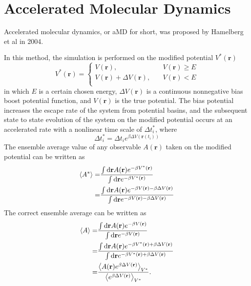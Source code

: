 \section{Accelerated Molecular Dynamics\label{Sec:ES:aMD}}
Accelerated molecular dynamics, or aMD for short, was proposed by Hamelberg et al in 2004.\cite{HamelbergJCP2004}

In this method, the simulation is performed on the modified potential $V^\ast(\mathbf{r})$
\begin{equation}
	V^\ast(\mathbf{r})= 
	\left\{ 
	\begin{array}{rl} 
		V(\mathbf{r}), &\quad V(\mathbf{r})\geq E\\ 
		V(\mathbf{r})+\Delta V(\mathbf{r}), &\quad V(\mathbf{r})< E\\  
	\end{array} 
	\right.
\end{equation}
in which $E$ is a certain chosen energy, $\Delta V(\mathbf{r})$ is a continuous nonnegative bias boost potential function, and $V(\mathbf{r})$ is the true potential. The bias potential increases the escape rate of the system from potential basins, and the subsequent state to state evolution of the system on the modified potential occurs at an accelerated rate with a nonlinear time scale of $\Delta t^\ast_i$, where
\begin{equation}
	\Delta t^\ast_i=\Delta t_i e^{\beta \Delta V(\mathbf{r}(t_i))}
\end{equation}
The ensemble average value of any observable $A(\mathbf{r})$ taken on the modified potential can be written as
\begin{align}
	\left<A^\ast\right>=&\frac{\int \mathop{}\!\mathrm{d} \mathbf{r}A(\mathbf{r})e^{-\beta V^{\ast}(\mathbf{r})}}{\int \mathop{}\!\mathrm{d} \mathbf{r} e^{-\beta V^{\ast}(\mathbf{r})}}\notag\\
	        =&\frac{\int \mathop{}\!\mathrm{d} \mathbf{r}A(\mathbf{r})e^{-\beta V(\mathbf{r})-\beta \Delta V(\mathbf{r})}}{\int \mathop{}\!\mathrm{d} \mathbf{r} e^{-\beta V(\mathbf{r})-\beta \Delta V(\mathbf{r})}}
\end{align}
The correct ensemble average can be written as
\begin{align}
	\left<A\right>=&\frac{\int \mathop{}\!\mathrm{d} \mathbf{r}A(\mathbf{r})e^{-\beta V(\mathbf{r})}}{\int \mathop{}\!\mathrm{d} \mathbf{r} e^{-\beta V(\mathbf{r})}}\notag\\
	=&\frac{\int \mathop{}\!\mathrm{d} \mathbf{r}A(\mathbf{r})e^{-\beta V^\ast(\mathbf{r})+\beta \Delta V(\mathbf{r})}}{\int \mathop{}\!\mathrm{d} \mathbf{r} e^{-\beta V^\ast(\mathbf{r})+\beta \Delta V(\mathbf{r})}}\notag\\
	=&\frac{\left<A(\mathbf{r})e^{\beta \Delta V(\mathbf{r})}\right>_{V^\ast}}{\left<e^{\beta \Delta V(\mathbf{r}) }\right>_{V^\ast}}.
\end{align}

